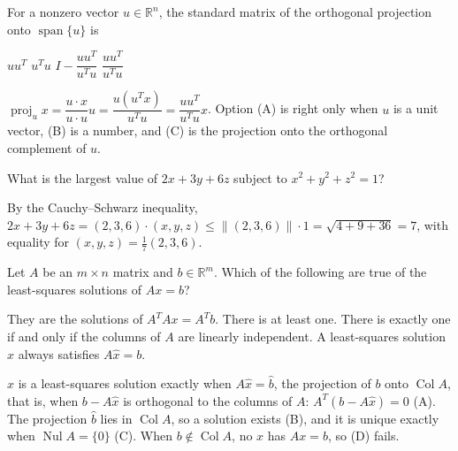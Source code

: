 \begin{question}[id=orth-16]
For a nonzero vector $u \in \mathbb{R}^n$, the standard matrix of the orthogonal projection onto $\operatorname{span}\{u\}$ is
\begin{options}
  \option $uu^T$
  \option $u^Tu$
  \option $I - \dfrac{uu^T}{u^Tu}$
  \correct $\dfrac{uu^T}{u^Tu}$
\end{options}
\begin{solution}
$\operatorname{proj}_u x = \dfrac{u \cdot x}{u \cdot u}u = \dfrac{u(u^Tx)}{u^Tu} = \dfrac{uu^T}{u^Tu}x$. Option (A) is right only when $u$ is a unit vector, (B) is a number, and (C) is the projection onto the orthogonal complement of $u$.
\end{solution}
\end{question}

\begin{question}[id=orth-17, marks=2]
What is the largest value of $2x + 3y + 6z$ subject to $x^2 + y^2 + z^2 = 1$?
\begin{solution}
By the Cauchy--Schwarz inequality, $2x + 3y + 6z = (2, 3, 6) \cdot (x, y, z) \le \|(2, 3, 6)\| \cdot 1 = \sqrt{4 + 9 + 36} = 7$, with equality for $(x, y, z) = \frac{1}{7}(2, 3, 6)$.
\end{solution}
\end{question}

\begin{question}[id=orth-18, type=msq, marks=2]
Let $A$ be an $m \times n$ matrix and $b \in \mathbb{R}^m$. Which of the following are true of the least-squares solutions of $Ax = b$?
\begin{options}
  \correct They are the solutions of $A^TAx = A^Tb$.
  \correct There is at least one.
  \correct There is exactly one if and only if the columns of $A$ are linearly independent.
  \option A least-squares solution $\hat{x}$ always satisfies $A\hat{x} = b$.
\end{options}
\begin{solution}
$\hat{x}$ is a least-squares solution exactly when $A\hat{x} = \hat{b}$, the projection of $b$ onto $\operatorname{Col} A$, that is, when $b - A\hat{x}$ is orthogonal to the columns of $A$: $A^T(b - A\hat{x}) = 0$ (A). The projection $\hat{b}$ lies in $\operatorname{Col} A$, so a solution exists (B), and it is unique exactly when $\operatorname{Nul} A = \{0\}$ (C). When $b \notin \operatorname{Col} A$, no $x$ has $Ax = b$, so (D) fails.
\end{solution}
\end{question}

